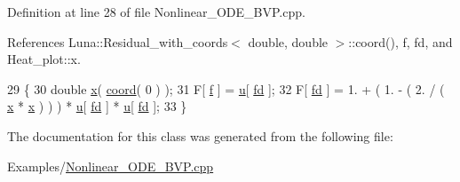 Definition at line 28 of file Nonlinear\+\_\+\+O\+D\+E\+\_\+\+B\+V\+P.\+cpp.



References Luna\+::\+Residual\+\_\+with\+\_\+coords$<$ double, double $>$\+::coord(), f, fd, and Heat\+\_\+plot\+::x.


\begin{DoxyCode}
29             \{
30         \textcolor{keywordtype}{double} \hyperlink{namespaceHeat__plot_aa88370c16b85b784ccbde3ed88bc1991}{x}( \hyperlink{classLuna_1_1Residual__with__coords_a3fa4c950a944743c0380e4c151728372}{coord}( 0 ) );
31                 F[ \hyperlink{Nonlinear__ODE__BVP_8cpp_a06fc87d81c62e9abb8790b6e5713c55ba7ce756344023b99e5ab27b804feb765c}{f} ]   = \hyperlink{namespaceHeat__plot_ae622b86afa46daa3e9b887624ab1bf26}{u}[ \hyperlink{Nonlinear__ODE__BVP_8cpp_a06fc87d81c62e9abb8790b6e5713c55ba1e4d60e5b05464d07a30096747025a42}{fd} ];
32                 F[ \hyperlink{Nonlinear__ODE__BVP_8cpp_a06fc87d81c62e9abb8790b6e5713c55ba1e4d60e5b05464d07a30096747025a42}{fd} ]  = 1. + ( 1. - ( 2. / ( \hyperlink{namespaceHeat__plot_aa88370c16b85b784ccbde3ed88bc1991}{x} * \hyperlink{namespaceHeat__plot_aa88370c16b85b784ccbde3ed88bc1991}{x} ) ) ) * \hyperlink{namespaceHeat__plot_ae622b86afa46daa3e9b887624ab1bf26}{u}[ \hyperlink{Nonlinear__ODE__BVP_8cpp_a06fc87d81c62e9abb8790b6e5713c55ba1e4d60e5b05464d07a30096747025a42}{fd} ] * \hyperlink{namespaceHeat__plot_ae622b86afa46daa3e9b887624ab1bf26}{u}[ 
      \hyperlink{Nonlinear__ODE__BVP_8cpp_a06fc87d81c62e9abb8790b6e5713c55ba1e4d60e5b05464d07a30096747025a42}{fd} ];
33             \}
\end{DoxyCode}


The documentation for this class was generated from the following file\+:\begin{DoxyCompactItemize}
\item 
Examples/\hyperlink{Nonlinear__ODE__BVP_8cpp}{Nonlinear\+\_\+\+O\+D\+E\+\_\+\+B\+V\+P.\+cpp}\end{DoxyCompactItemize}

